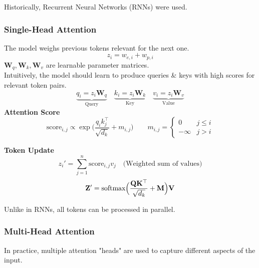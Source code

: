 {\footnotesize
    \remark Historically, Recurrent Neural Networks (RNNs) were used.\\
}

\subsubsection{Single-Head Attention}
The model weighs previous tokens relevant for the next one.\\
$$
    z_i = w_{e,i} + w_{p,i}
$$
$\mathbf{W}_q, \mathbf{W}_k, \mathbf{W}_v$ are learnable parameter matrices.\\ 
Intuitively, the model should learn to produce queries \& keys with high scores for relevant token pairs.
$$
    \underbrace{q_i = z_i \mathbf{W}_q}_\text{Query} \quad \underbrace{k_i = z_i \mathbf{W}_k}_\text{Key} \quad \underbrace{v_i = z_i \mathbf{W}_v}_\text{Value}
$$
 \textbf{Attention Score}\\
$$
    \text{score}_{i,j} \propto \exp\Biggl( \frac{q_i k_j^\top}{\sqrt{d_k}} + m_{i,j} \Biggr) 
    \qquad m_{i,j} = \begin{cases}
        0 & j \leq i \\
        -\infty & j > i
    \end{cases}
$$

 \textbf{Token Update}
$$
    z_i' = \sum_{j=1}^n \text{score}_{i,j} v_j \quad \text{(Weighted sum of values)}
$$
$$
    \mathbf{Z}' = \text{softmax}\Bigl( \frac{\mathbf{Q}\mathbf{K}^\top}{\sqrt{d_k}} + \mathbf{M} \Bigr)\mathbf{V}
$$

{\footnotesize
    \remark Unlike in RNNs, all tokens can be processed in parallel.
}

\newpage
\subsubsection{Multi-Head Attention}

In practice, multiple attention "heads" are used to capture different aspects of the input.\\

